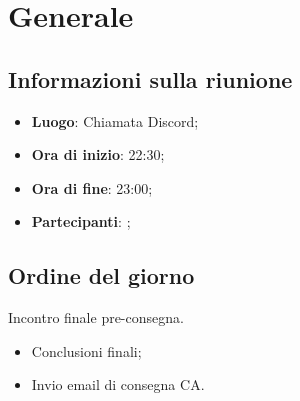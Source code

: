 \section{Generale}

\vspace{10pt}


\subsection{Informazioni sulla riunione}
\begin{itemize}
	\item \textbf{Luogo}: Chiamata Discord;
	\item \textbf{Ora di inizio}: 22:30;
	\item \textbf{Ora di fine}: 23:00;
	\item \textbf{Partecipanti}: \team;
\end{itemize}

\vspace{5pt}

\subsection{Ordine del giorno}
Incontro finale pre-consegna.
\begin{itemize}
	\item Conclusioni finali;
	\item Invio email di consegna CA.
\end{itemize}
